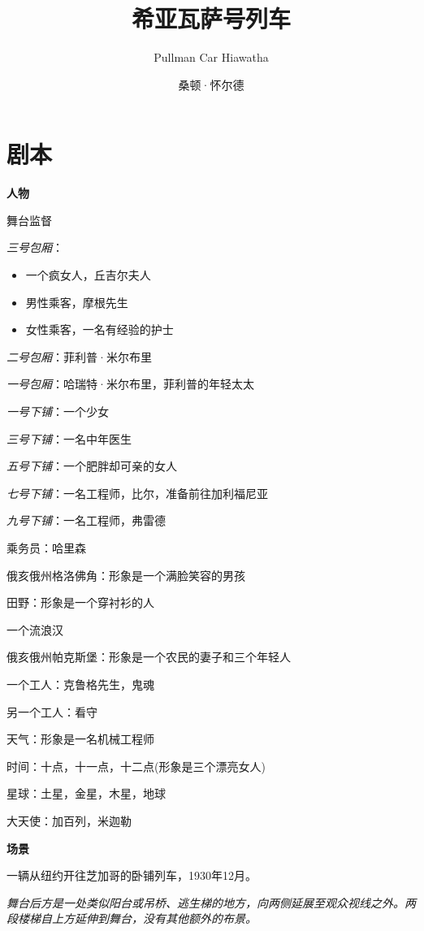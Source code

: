 \documentclass[lang=cn,newtx,12pt,scheme=chinese]{elegantbook}
\title{希亚瓦萨号列车}
\subtitle{Pullman Car Hiawatha}
\author{桑顿·怀尔德}
\institute{抱了又抱戏剧社}
\begin{document}
\maketitle
\frontmatter

\tableofcontents

\mainmatter

\part{剧本}


{\huge\textbf{人物}}

舞台监督

\textit{三号包厢}：
\begin{itemize}[leftmargin=5em, labelsep=0.6em, itemsep=0.2em]
    \item 一个疯女人，丘吉尔夫人
    \item 男性乘客，摩根先生
    \item 女性乘客，一名有经验的护士
\end{itemize}

\textit{二号包厢}：菲利普·米尔布里

\textit{一号包厢}：哈瑞特·米尔布里，菲利普的年轻太太

\textit{一号下铺}：一个少女

\textit{三号下铺}：一名中年医生

\textit{五号下铺}：一个肥胖却可亲的女人

\textit{七号下铺}：一名工程师，比尔，准备前往加利福尼亚

\textit{九号下铺}：一名工程师，弗雷德

乘务员：哈里森


俄亥俄州格洛佛角：形象是一个满脸笑容的男孩

田野：形象是一个穿衬衫的人

一个流浪汉

俄亥俄州帕克斯堡：形象是一个农民的妻子和三个年轻人

一个工人：克鲁格先生，鬼魂

另一个工人：看守

天气：形象是一名机械工程师

时间：十点，十一点，十二点(形象是三个漂亮女人)

星球：土星，金星，木星，地球

大天使：加百列，米迦勒

{\huge \textbf{场景}}

一辆从纽约开往芝加哥的卧铺列车，1930年12月。

\textit{舞台后方是一处类似阳台或吊桥、逃生梯的地方，向两侧延展至观众视线之外。两段楼梯自上方延伸到舞台，没有其他额外的布景。}
\end{document}

